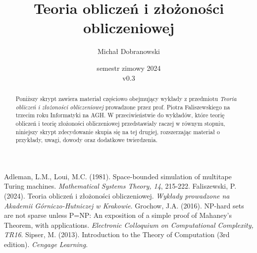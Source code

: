 \documentclass{scrartcl}
\title{Teoria obliczeń i złożoności obliczeniowej}
\author{Michał Dobranowski}
\date{semestr zimowy 2024 \\ v0.3}
\begin{document}
    \maketitle
    \begin{abstract}
        \noindent Poniższy skrypt zawiera materiał częściowo obejmujący wykłady z przedmiotu \textit{Teoria obliczeń i złożoności obliczeniowej} prowadzone przez prof. Piotra Faliszewskiego na trzecim roku Informatyki na AGH. W przeciwieństwie do wykładów, które teorię obliczeń i teorię złożoności obliczeniowej przedstawiały raczej w równym stopniu, niniejszy skrypt zdecydowanie skupia się na tej drugiej, rozszerzając materiał o przykłady, uwagi, dowody oraz dodatkowe twierdzenia.
    \end{abstract}
    \newpage
    \tableofcontents
    \newpage

    \SetVertexStyle[FillColor=gray, FillOpacity=0.4]
    \SetEdgeStyle[Color=black, LineWidth=0.8pt]

    
    

    \begin{thebibliography}{9}
         Adleman, L.M., Loui, M.C. (1981). Space-bounded simulation of multitape Turing machines. \textit{Mathematical Systems Theory, 14}, 215-222.
         Faliszewski, P. (2024). Teoria obliczeń i złożoności obliczeniowej. \textit{Wykłady prowadzone na Akademii Górniczo-Hutniczej w Krakowie}.
         Grochow, J.A. (2016). NP-hard sets are not sparse unless P=NP: An exposition of a simple proof of Mahaney's Theorem, with applications. \textit{Electronic Colloquium on Computational Complexity, TR16}.
         Sipser, M. (2013). Introduction to the Theory of Computation (3rd edition). \textit{Cengage Learning}.
    \end{thebibliography}
\end{document}

